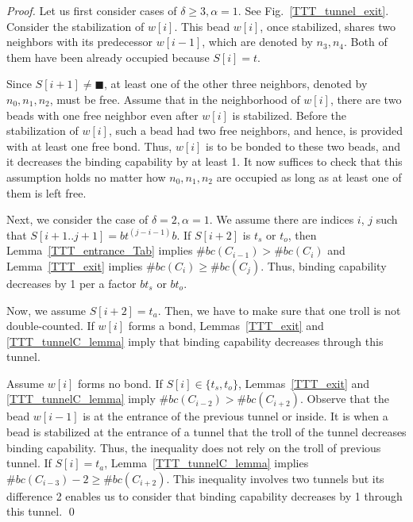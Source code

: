 \begin{proof}%
Let us first consider cases of $\delta \geq 3, \alpha = 1$. 
See Fig.~\ref{TTT_tunnel_exit}. Consider the stabilization of $w[i]$. 
This bead $w[i]$, once stabilized, shares two neighbors with its predecessor $w[i-1]$, which are denoted by $n_3, n_4$. 
Both of them have been already occupied because $S[i] = t$. 

Since $S[i+1] \neq \blacksquare$, at least one of the other three neighbors, denoted by $n_0, n_1, n_2$, must be free. 
Assume that in the neighborhood of $w[i]$, there are two beads with one free neighbor even after $w[i]$ is stabilized. 
Before the stabilization of $w[i]$, such a bead had two free neighbors, and hence, is provided with at least one free bond. 
Thus, $w[i]$ is to be bonded to these two beads, and it decreases the binding capability by at least 1. 
It now suffices to check that this assumption holds no matter how $n_0, n_1, n_2$ are occupied as long as at least one of them is left free. 

Next, we consider the case of $\delta = 2, \alpha = 1$. We assume there are indices $i$, $j$ such that $S[i+1..j+1] = bt^{(j-i-1)}b$.
If $S[i+2]$ is $ t_s$ or  $t_o$, then Lemma~\ref{TTT_entrance_Tab} implies $\#bc(C_{i-1}) > \#bc(C_{i})$ and  Lemma~\ref{TTT_exit} implies $\#bc(C_{i}) \geq \#bc(C_{j})$.
Thus, binding capability decreases by 1 per a factor $bt_s$ or $bt_o$.


Now, we assume $S[i+2] = t_a$.
Then, we have to make sure that one troll is not double-counted.
If $w[i]$ forms a bond, Lemmas~\ref{TTT_exit} and \ref{TTT_tunnelC_lemma} imply that binding capability decreases through this tunnel.

Assume $w[i]$ forms no bond.
If $S[i] \in \{t_s, t_o\}$, Lemmas~\ref{TTT_exit} and \ref{TTT_tunnelC_lemma} imply $\#bc(C_{i-2}) > \#bc(C_{i+2})$.
Observe that the bead $w[i-1]$ is at the entrance of the previous tunnel or inside.
It is when a bead is stabilized at the entrance of a tunnel that the troll of the tunnel decreases binding capability.
Thus, the inequality does not rely on the troll of previous tunnel.
If $S[i] = t_a$, Lemma~\ref{TTT_tunnelC_lemma} implies $\#bc(C_{i-3}) - 2 \geq \#bc(C_{i+2})$.
This inequality involves two tunnels but its difference 2 enables us to consider that binding capability decreases by 1 through this tunnel. \qed
\end{proof}





